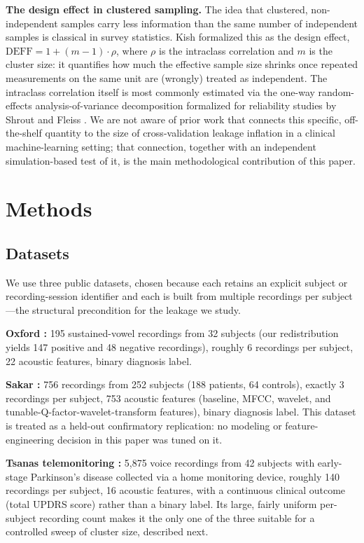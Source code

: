 \documentclass[11pt]{article}
\begin{document}
\textbf{The design effect in clustered sampling.} The idea that clustered, non-independent samples carry less information than the same number of independent samples is classical in survey statistics. Kish \cite{kish1965} formalized this as the design effect, $\mathrm{DEFF} = 1 + (m-1)\cdot\rho$, where $\rho$ is the intraclass correlation and $m$ is the cluster size: it quantifies how much the effective sample size shrinks once repeated measurements on the same unit are (wrongly) treated as independent. The intraclass correlation itself is most commonly estimated via the one-way random-effects analysis-of-variance decomposition formalized for reliability studies by Shrout and Fleiss \cite{shrout1979}. We are not aware of prior work that connects this specific, off-the-shelf quantity to the size of cross-validation leakage inflation in a clinical machine-learning setting; that connection, together with an independent simulation-based test of it, is the main methodological contribution of this paper.

\section{Methods}
\subsection{Datasets}
We use three public datasets, chosen because each retains an explicit subject or recording-session identifier and each is built from multiple recordings per subject---the structural precondition for the leakage we study.

\textbf{Oxford \cite{little2007}:} 195 sustained-vowel recordings from 32 subjects (our redistribution yields 147 positive and 48 negative recordings), roughly 6 recordings per subject, 22 acoustic features, binary diagnosis label.

\textbf{Sakar \cite{sakar2019}:} 756 recordings from 252 subjects (188 patients, 64 controls), exactly 3 recordings per subject, 753 acoustic features (baseline, MFCC, wavelet, and tunable-Q-factor-wavelet-transform features), binary diagnosis label. This dataset is treated as a held-out confirmatory replication: no modeling or feature-engineering decision in this paper was tuned on it.

\textbf{Tsanas telemonitoring \cite{tsanas2010}:} 5,875 voice recordings from 42 subjects with early-stage Parkinson's disease collected via a home monitoring device, roughly 140 recordings per subject, 16 acoustic features, with a continuous clinical outcome (total UPDRS score) rather than a binary label. Its large, fairly uniform per-subject recording count makes it the only one of the three suitable for a controlled sweep of cluster size, described next.
\end{document}
